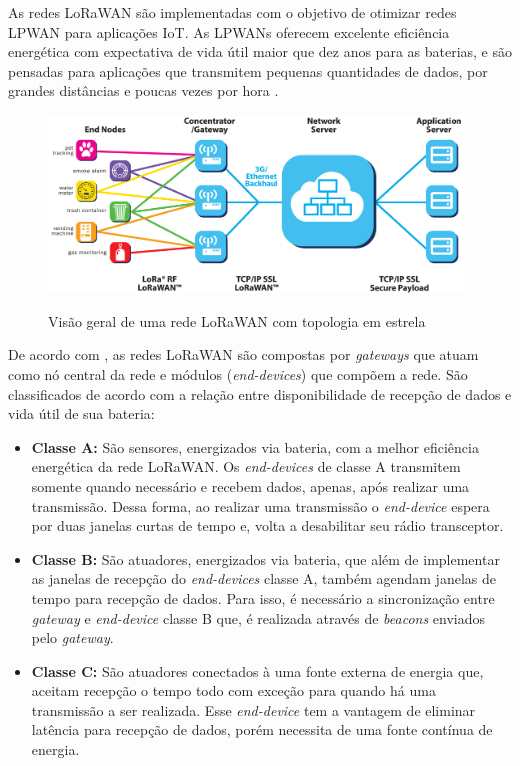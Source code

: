 As redes LoRaWAN são implementadas com o objetivo de otimizar redes \ac{LPWAN} para aplicações \ac{IoT}. As \ac{LPWAN}s oferecem excelente eficiência energética com expectativa de vida útil maior que dez anos para as baterias, e são pensadas para aplicações que transmitem pequenas quantidades de dados, por grandes distâncias e poucas vezes por hora \cite{loraAllianceWhatIs}.

\begin{figure}[h!]
    \centering
    \includegraphics[width=11cm]{figs/LoRaWAN_Overview.png}
    \label{loraWAN_Overview}
    \caption{Visão geral de uma rede LoRaWAN com topologia em estrela \cite{loraAllianceWhatIs}}
\end{figure}

De acordo com , as redes LoRaWAN são compostas por \textit{gateways} que atuam como nó central da rede e módulos (\textit{end-devices}) que compõem a rede. São classificados de acordo com a relação entre disponibilidade de recepção de dados e vida útil de sua bateria:

\begin{itemize}
  \item \textbf{Classe A:} São sensores, energizados via bateria, com a melhor eficiência energética da rede LoRaWAN. Os \textit{end-devices} de classe A transmitem somente quando necessário e recebem dados, apenas, após realizar uma transmissão. Dessa forma, ao realizar uma transmissão o \textit{end-device} espera por duas janelas curtas de tempo e, volta a desabilitar seu rádio transceptor.
  \item \textbf{Classe B:} São atuadores, energizados via bateria, que além de implementar as janelas de recepção do \textit{end-devices} classe A, também agendam janelas de tempo para recepção de dados. Para isso, é necessário a sincronização entre \textit{gateway} e \textit{end-device} classe B que, é realizada através de \textit{beacons} enviados pelo \textit{gateway}.
  \item \textbf{Classe C:} São atuadores conectados à uma fonte externa de energia que, aceitam recepção o tempo todo com exceção para quando há uma transmissão a ser realizada. Esse \textit{end-device} tem a vantagem de eliminar latência para recepção de dados, porém necessita de uma fonte contínua de energia.
\end{itemize}

